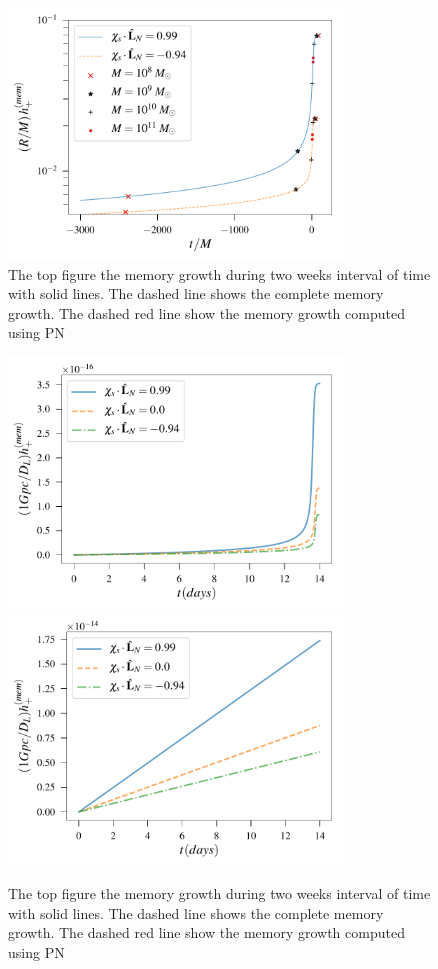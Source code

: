 \documentclass[twocolumn,showpacs,aps,prd,nobibnotes,floatfix]{revtex4-1}
\begin{document}
\begin{widetext}
\begin{figure}
	\includegraphics[width=3.5in]{../plots/PlotfromMathematicaData/MemoryGrowth2weeksGeoUnits.pdf}
	\caption{The top figure the memory growth during two weeks interval of time with solid lines. The dashed line shows the complete memory growth. The dashed red line show the memory growth computed using PN}
	\label{fig:resedualGrowth}
\end{figure} 

\begin{figure}
	\includegraphics[width=3.5in]{../plots/PlotfromMathematicaData/MemoryGrowth2weeksInDays10pow8MSun.pdf}
	\includegraphics[width=3.5in]{../plots/PlotfromMathematicaData/MemoryGrowth2weeksInDays10pow10MSun.pdf}
	\caption{The top figure the memory growth during two weeks interval of time with solid lines. The dashed line shows the complete memory growth. The dashed red line show the memory growth computed using PN}
	\label{fig:resedualGrowth}
\end{figure} 
\end{widetext}
\end{document}
